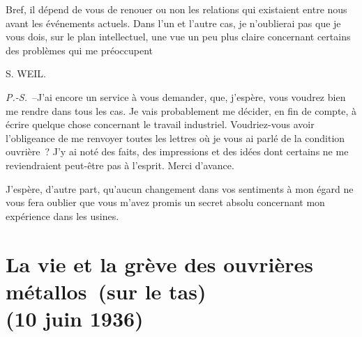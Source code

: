 \documentclass[french,twoside]{book} %
\begin{document}
Bref, il dépend de vous de renouer ou non les relations qui existaient entre nous avant les événements actuels. Dans l'un et l'autre cas, je n'oublierai pas que je vous dois, sur le plan intellectuel, une vue un peu plus claire concernant certains des problèmes qui me préoccupent\par
S. WEIL.\par
{\itshape P.-S.} –J'ai encore un service à vous demander, que, j'espère, vous voudrez bien me rendre dans tous les cas. Je vais probablement me décider, en fin de compte, à écrire quelque chose concernant le travail industriel. Voudriez-vous avoir l'obligeance de me renvoyer toutes les lettres où je vous ai parlé de la condition ouvrière ? J'y ai noté des faits, des impressions et des idées dont certains ne me reviendraient peut-être pas à l'esprit. Merci d'avance.\par
J'espère, d'autre part, qu'aucun changement dans vos sentiments à mon égard ne vous fera oublier que vous m'avez promis un secret absolu concernant mon expérience dans les usines.
\section[La vie et la grève des ouvrières métallos  (sur le tas) (10 juin 1936)]{La vie et la grève des ouvrières métallos \protect\footnotemark  (sur le tas) \\
(10 juin 1936)}\renewcommand{\leftmark}{La vie et la grève des ouvrières métallos  (sur le tas) \\
(10 juin 1936)}
\end{document}
